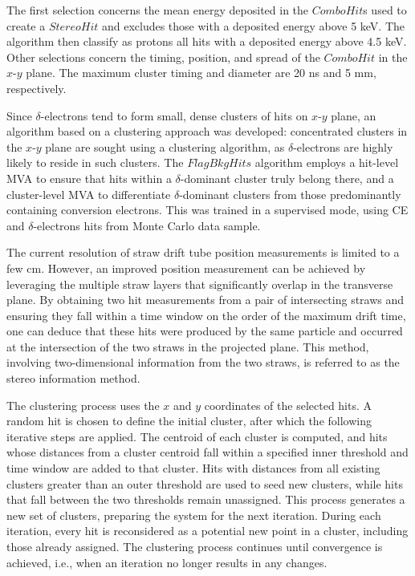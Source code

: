 The first selection concerns the mean energy deposited in  
the $ComboHit$s used to create a $StereoHit$ and excludes 
those with a deposited energy above 5 keV. 
The algorithm then classify as protons all hits with a deposited energy above 4.5 keV.
Other selections concern the timing, position, and spread of the $ComboHit$ 
in the $x$-$y$ plane. The maximum cluster timing 
and diameter are 20 ns and 5 mm, respectively.

Since $\delta$-electrons tend to form small, dense 
clusters of hits on $x$-$y$ plane, an algorithm based on a clustering 
approach was developed: concentrated clusters in the 
$x$-$y$ plane are sought using a clustering algorithm, 
as $\delta$-electrons are highly likely to reside 
in such clusters. The $FlagBkgHits$ algorithm employs 
a hit-level MVA to ensure that hits within a 
$\delta$-dominant cluster truly belong there, 
and a cluster-level MVA to differentiate 
$\delta$-dominant clusters from those 
predominantly containing conversion electrons. 
This was trained in a supervised mode, using CE and $\delta$-electrons hits from 
Monte Carlo data sample.

The current resolution of straw drift tube 
position measurements is limited to a few cm. 
However, an improved position measurement can be 
achieved by leveraging the multiple straw layers that 
significantly overlap in the transverse plane. 
By obtaining two hit measurements from a pair of 
intersecting straws and ensuring they fall within 
a time window on the order of the maximum drift time, 
one can deduce that these hits were produced by the 
same particle and occurred at the intersection of the 
two straws in the projected plane. This method, 
involving two-dimensional information from the two 
straws, is referred to as the stereo information method.

The clustering process uses the $x$ and $y$ coordinates 
of the selected hits. A random hit is chosen to define 
the initial cluster, after which the following iterative 
steps are applied. The centroid of each cluster is 
computed, and hits whose distances from a cluster 
centroid fall within a specified inner threshold 
and time window are added to that cluster. Hits 
with distances from all existing clusters greater 
than an outer threshold are used to seed new 
clusters, while hits that fall between the two 
thresholds remain unassigned. This process 
generates a new set of clusters, preparing the 
system for the next iteration. During each 
iteration, every hit is reconsidered as a 
potential new point in a cluster, including 
those already assigned. The clustering process 
continues until convergence is achieved, i.e., 
when an iteration no longer results in any changes.


